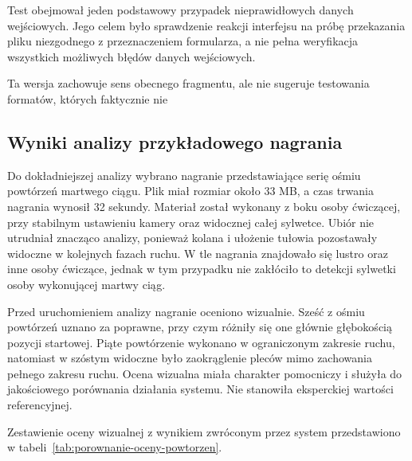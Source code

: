 Test obejmował jeden podstawowy przypadek nieprawidłowych danych wejściowych. Jego celem było sprawdzenie reakcji interfejsu na próbę przekazania pliku niezgodnego z przeznaczeniem formularza, a nie pełna weryfikacja wszystkich możliwych błędów danych wejściowych.

Ta wersja zachowuje sens obecnego fragmentu, ale nie sugeruje testowania formatów, których faktycznie nie

\subsection{Wyniki analizy przykładowego nagrania}

Do dokładniejszej analizy wybrano nagranie przedstawiające serię ośmiu powtórzeń martwego ciągu. Plik miał rozmiar około 33 MB, a czas trwania nagrania wynosił 32 sekundy. Materiał został wykonany z boku osoby ćwiczącej, przy stabilnym ustawieniu kamery oraz widocznej całej sylwetce. Ubiór nie utrudniał znacząco analizy, ponieważ kolana i ułożenie tułowia pozostawały widoczne w kolejnych fazach ruchu. W tle nagrania znajdowało się lustro oraz inne osoby ćwiczące, jednak w tym przypadku nie zakłóciło to detekcji sylwetki osoby wykonującej martwy ciąg.

Przed uruchomieniem analizy nagranie oceniono wizualnie. Sześć z ośmiu powtórzeń uznano za poprawne, przy czym różniły się one głównie głębokością pozycji startowej. Piąte powtórzenie wykonano w ograniczonym zakresie ruchu, natomiast w szóstym widoczne było zaokrąglenie pleców mimo zachowania pełnego zakresu ruchu. Ocena wizualna miała charakter pomocniczy i służyła do jakościowego porównania działania systemu. Nie stanowiła eksperckiej wartości referencyjnej.

Zestawienie oceny wizualnej z wynikiem zwróconym przez system przedstawiono w tabeli~\ref{tab:porownanie-oceny-powtorzen}.


